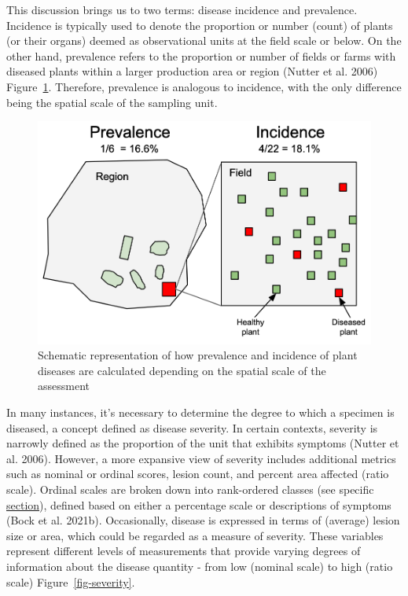 \documentclass[
  letterpaper,
  DIV=11,
  numbers=noendperiod]{scrreprt}
\begin{document}
This discussion brings us to two terms: disease incidence and
prevalence. Incidence is typically used to denote the proportion or
number (count) of plants (or their organs) deemed as observational units
at the field scale or below. On the other hand, prevalence refers to the
proportion or number of fields or farms with diseased plants within a
larger production area or region (Nutter et al. 2006)
Figure~\ref{fig-prevalence_incidence}. Therefore, prevalence is
analogous to incidence, with the only difference being the spatial scale
of the sampling unit.

\begin{figure}

{\centering \includegraphics[width=5in,height=\textheight]{imgs/prevalence_incidence.png}

}

\caption{\label{fig-prevalence_incidence}Schematic representation of how
prevalence and incidence of plant diseases are calculated depending on
the spatial scale of the assessment}

\end{figure}

In many instances, it's necessary to determine the degree to which a
specimen is diseased, a concept defined as disease severity. In certain
contexts, severity is narrowly defined as the proportion of the unit
that exhibits symptoms (Nutter et al. 2006). However, a more expansive
view of severity includes additional metrics such as nominal or ordinal
scores, lesion count, and percent area affected (ratio scale). Ordinal
scales are broken down into rank-ordered classes (see specific
\href{data-ordinal.html}{section}), defined based on either a percentage
scale or descriptions of symptoms (Bock et al. 2021b). Occasionally,
disease is expressed in terms of (average) lesion size or area, which
could be regarded as a measure of severity. These variables represent
different levels of measurements that provide varying degrees of
information about the disease quantity - from low (nominal scale) to
high (ratio scale) Figure~\ref{fig-severity}.
\end{document}
